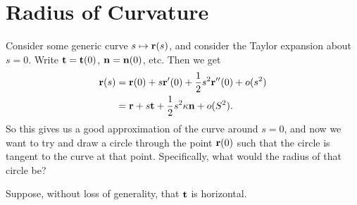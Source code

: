 \documentclass[a4paper]{scrreprt}
\begin{document}
\section{Radius of Curvature}

Consider some generic curve $s \mapsto \mathbf{r}(s)$, and consider the Taylor expansion about $s = 0$. Write $\mathbf{t} = \mathbf{t}(0)$, $\mathbf{n} = \mathbf{n}(0)$, etc. Then we get
\begin{align*}
	\mathbf{r}(s) &= \mathbf{r}(0) + s\mathbf{r}'(0) + \frac{1}{2}s^2 \mathbf{r}''(0) + o(s^2) \\
	&= \mathbf{r} + s\mathbf{t} + \frac{1}{2}s^2 \kappa \mathbf{n}	+ o(S^2).
\end{align*}
So this gives us a good approximation of the curve around $s = 0$, and now we want to try and draw a circle through the point $\mathbf{r}(0)$ such that the circle is tangent to the curve at that point. Specifically, what would the radius of that circle be?

Suppose, without loss of generality, that $\mathbf{t}$ is horizontal.
\end{document}
